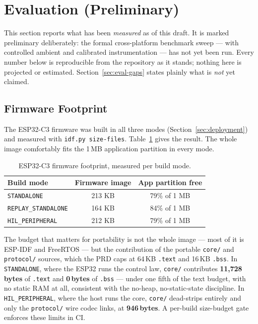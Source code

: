 \section{Evaluation (Preliminary)}\label{sec:evaluation}

This section reports what has been \emph{measured} as of this draft. It is marked preliminary deliberately: the formal cross-platform benchmark sweep --- with controlled ambient and calibrated instrumentation --- has not yet been run. Every number below is reproducible from the repository as it stands; nothing here is projected or estimated. Section~\ref{sec:eval-gaps} states plainly what is \emph{not} yet claimed.

\subsection{Firmware Footprint}

The ESP32-C3 firmware was built in all three modes (Section~\ref{sec:deployment}) and measured with \texttt{idf.py size-files}. Table~\ref{tab:footprint} gives the result. The whole image comfortably fits the 1\,MB application partition in every mode.

\begin{table}[h]
\centering
\begin{tabular}{lcc}
\toprule
\textbf{Build mode} & \textbf{Firmware image} & \textbf{App partition free} \\
\midrule
\texttt{STANDALONE}        & 213 KB & 79\% of 1 MB \\
\texttt{REPLAY\_STANDALONE} & 164 KB & 84\% of 1 MB \\
\texttt{HIL\_PERIPHERAL}    & 212 KB & 79\% of 1 MB \\
\bottomrule
\end{tabular}
\caption{ESP32-C3 firmware footprint, measured per build mode.}
\label{tab:footprint}
\end{table}

The budget that matters for portability is not the whole image --- most of it is ESP-IDF and FreeRTOS --- but the contribution of the portable \texttt{core/} and \texttt{protocol/} sources, which the PRD caps at 64\,KB \texttt{.text} and 16\,KB \texttt{.bss}. In \texttt{STANDALONE}, where the ESP32 runs the control law, \texttt{core/} contributes \textbf{11{,}728\,bytes} of \texttt{.text} and \textbf{0\,bytes} of \texttt{.bss} --- under one fifth of the text budget, with no static RAM at all, consistent with the no-heap, no-static-state discipline. In \texttt{HIL\_PERIPHERAL}, where the host runs the core, \texttt{core/} dead-strips entirely and only the \texttt{protocol/} wire codec links, at \textbf{946\,bytes}. A per-build size-budget gate enforces these limits in CI.


